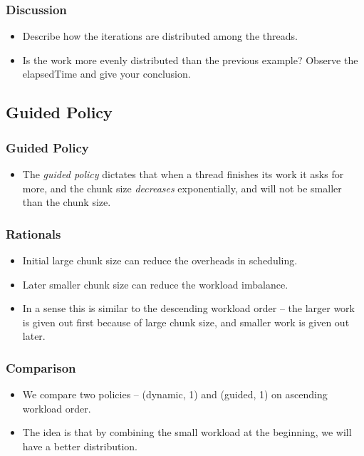 \documentclass{beamer}
\begin{document}
\begin{frame}
  \frametitle{Discussion}
  \begin{itemize}
  \item Describe how the iterations are distributed among the threads.
  \item Is the work more evenly distributed than the previous example?
    Observe the elapsedTime and give your conclusion.
  \end{itemize}
\end{frame}

\subsection{Guided Policy}


\begin{frame}
  \frametitle{Guided Policy}
  \begin{itemize}
  \item The {\em guided policy} dictates that when a thread finishes
    its work it asks for more, and the chunk size {\em decreases}
    exponentially, and will not be smaller than the chunk size.
  \end{itemize}
\end{frame}

\begin{frame}
  \frametitle{Rationals}
  \begin{itemize}
  \item Initial large chunk size can reduce the overheads in scheduling.
  \item Later smaller chunk size can reduce the workload imbalance.
  \item In a sense this is similar to the descending workload order --
    the larger work is given out first because of large chunk size, and
    smaller work is given out later.
  \end{itemize}
\end{frame}


\begin{frame}
  \frametitle{Comparison}
  \begin{itemize}
  \item We compare two policies -- (dynamic, 1) and (guided, 1) on
    ascending workload order.
  \item The idea is that by combining the small workload at the
    beginning, we will have a better distribution.
  \end{itemize}
\end{frame}
\end{document}
